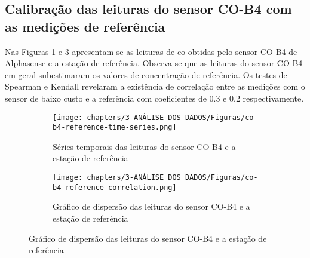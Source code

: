 \subsection{Calibração das leituras do sensor CO-B4 com as medições de referência}

Nas Figuras \ref{fig:data-co-reference-time-series} e \ref{fig:data-co-reference-corr} apresentam-se as leituras de \acrshort{co} obtidas pelo sensor CO-B4 de Alphasense e a estação de referência. Observa-se que as leituras do sensor CO-B4 em geral subestimaram os valores de concentração de referência. Os testes de Spearman e Kendall revelaram a existência de correlação entre as medições com o sensor de baixo custo e a referência com coeficientes de 0.3 e 0.2 respectivamente.

\begin{figure}[h]
    \centering
    \caption{Séries temporais e gráficos de dispersão das medições de \acrshort{co}}
    \begin{subfigure}{0.44\textwidth}
        \texttt{[image: chapters/3-ANÁLISE DOS DADOS/Figuras/co-b4-reference-time-series.png]}
        \caption{Séries temporais das leituras do sensor CO-B4 e a estação de referência}
        \label{fig:data-co-reference-time-series}
    \end{subfigure}
    \hfill
    \begin{subfigure}{0.54\textwidth}
        \texttt{[image: chapters/3-ANÁLISE DOS DADOS/Figuras/co-b4-reference-correlation.png]}
        \caption{Gráfico de dispersão das leituras do sensor CO-B4 e a estação de referência}
        \label{fig:data-co-reference-corr}
    \end{subfigure}
\end{figure}


